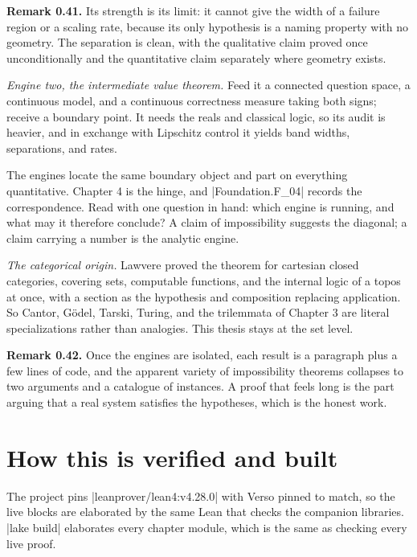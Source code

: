 \documentclass{memoir}
\begin{document}
\textbf{Remark 0.41.} Its strength is its limit: it cannot give the width of a failure region
or a scaling rate, because its only hypothesis is a naming property with no
geometry. The separation is clean, with the qualitative claim proved once
unconditionally and the quantitative claim separately where geometry exists.

\emph{Engine two, the intermediate value theorem.} Feed it a connected question
space, a continuous model, and a continuous correctness measure taking both
signs; receive a boundary point. It needs the reals and classical logic, so its
audit is heavier, and in exchange with Lipschitz control it yields band widths,
separations, and rates.

The engines locate the same boundary object and part on everything quantitative.
Chapter 4 is the hinge, and \LeanVerb|Foundation.F_04| records the correspondence. Read
with one question in hand: which engine is running, and what may it therefore
conclude? A claim of impossibility suggests the diagonal; a claim carrying a
number is the analytic engine.

\emph{The categorical origin.} Lawvere proved the theorem for cartesian closed
categories, covering sets, computable functions, and the internal logic of a
topos at once, with a section as the hypothesis and composition replacing
application. So Cantor, Gödel, Tarski, Turing, and the trilemmata of Chapter 3
are literal specializations rather than analogies. This thesis stays at the set
level.

\textbf{Remark 0.42.} Once the engines are isolated, each result is a paragraph plus a
few lines of code, and the apparent variety of impossibility theorems collapses
to two arguments and a catalogue of instances. A proof that feels long is the
part arguing that a real system satisfies the hypotheses, which is the honest
work.



\section{How this is verified and built}\label{Two--Schemas--of--Impossibility-005F-005F-005F--Machine--Checked--Limits--of--Trustworthy--Machine--Learning-005F-005F-005F--and--Why--They--Tighten--with--Capability----Preliminaries----How--this--is--verified--and--built}

The project pins \LeanVerb|leanprover/lean4:v4.28.0| with Verso pinned to match, so the
live blocks are elaborated by the same Lean that checks the companion libraries.
\LeanVerb|lake build| elaborates every chapter module, which is the same as checking
every live proof.
\end{document}
